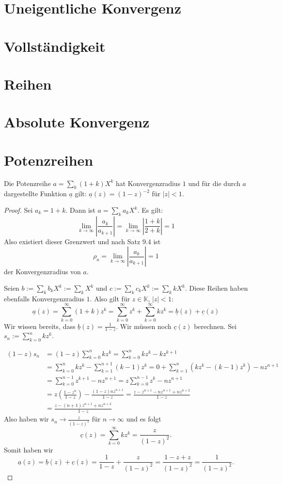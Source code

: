 \section{Uneigentliche Konvergenz}
\section{Vollständigkeit}
\section{Reihen}
\section{Absolute Konvergenz}
\section{Potenzreihen}

\setcounter{aufgabe}{1}
\begin{aufgabe}
Die Potenzreihe $a = \sum_k (1+k) X^k$ hat Konvergenzradius $1$ und
für die durch $a$ dargestellte Funktion $\underline a$ gilt: 
$\underline{a}(z) = (1-z)^{-2}$ für $|z| < 1$.
\end{aufgabe}
\begin{proof}
Sei $a_k = 1+k$. Dann ist $a = \sum_k a_k X^k$. Es gilt:
\[
\lim_{k \to \infty} \left| \frac{a_k}{a_{k+1}} \right| = \lim_{k \to \infty}
	\left| \frac{1+k}{2+k} \right| = 1
\]
Also existiert dieser Grenzwert und nach Satz 9.4 ist
\[
\rho_a = \lim_{k \to \infty} \left| \frac{a_k}{a_{k+1}} \right| = 1
\]
der Konvergenzradius von $a$.

Seien $b := \sum_k b_k X^k := \sum_k X^k$ und $c := \sum_k c_k X^k := \sum_k k X^k$.
Diese Reihen haben ebenfalls Konvergenzradius $1$. Also gilt für $z \in \mathbb K$, 
$|z| < 1$:
\[
\underline a(z) = \sum_{k=0}^\infty (1+k) z^k = \sum_{k=0}^\infty z^k + \sum_{k=0}^\infty k z^k
	= \underline b(z) + \underline c(z)
\]
Wir wissen bereits, dass $\underline b(z) = \frac{1}{1-z}$. Wir müssen noch $\underline c(z)$
berechnen. Sei $s_n := \sum_{k=0}^n k z^k$.

\begin{align*}
(1-z) s_n &= (1-z) \sum_{k=0}^n k z^k = \sum_{k=0}^n kz^k - k z^{k+1} \\
					&= \sum_{k=0}^n k z^k - \sum_{k=1}^{n+1} (k-1) z^k
					= 0 + \sum_{k=1}^n ( k z^k - (k-1) z^k ) - n z^{n+1} \\
					&= \sum_{k=0}^{n-1} z^{k+1} - n z^{n+1} = z \sum_{k=0}^{n-1} z^k - n z^{n+1} \\
					&= z \left( \frac{1-z^n}{1-z} \right) - \frac{(1-z) n z^{n+1}}{1-z}
					= \frac{z - z^{n+1} - n z^{n+1} + n z^{n+2}}{1-z} \\
					&= \frac{z - (n+1) z^{n+1} + n z^{n+2}}{1-z}
\end{align*}
Also haben wir $s_n \to \frac{z}{(1-z)^2}$ für $n \to \infty$ und es folgt
\[
\underline c(z) = \sum_{k=0}^\infty k z^k = \frac{z}{(1-z)^2} .
\]
Somit haben wir
\[
\underline a(z) = \underline b(z) + \underline c(z) = \frac{1}{1-z} + \frac{z}{(1-z)^2}
	= \frac{1 -z + z}{(1-z)^2} = \frac{1}{(1-z)^2} .
\]
\end{proof}
